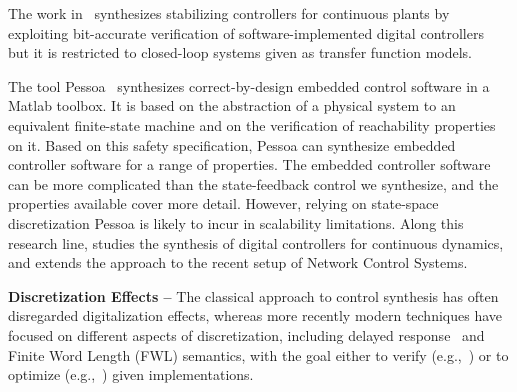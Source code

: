 \documentclass[sigconf]{llncs}
\begin{document}
The work in~\cite{hscc-paper} synthesizes stabilizing controllers for
continuous plants
by exploiting bit-accurate verification of software-implemented
digital controllers~\cite{Bessa16} but it is restricted to closed-loop
systems given as transfer function models.


The tool Pessoa~\cite{mazo2010pessoa} synthesizes correct-by-design embedded
control software in a Matlab toolbox.  It is based on the abstraction of a
physical system to an equivalent finite-state machine and on the
verification of reachability properties on it.  Based on this safety
specification, \mbox{Pessoa} can synthesize embedded controller software for
a range of properties.  The embedded controller software can be more
complicated than the state-feedback control we synthesize, and the
properties available cover more detail.  However, relying on state-space
discretization \mbox{Pessoa} is likely to incur in scalability limitations. 
Along this research line, \cite{Anta2010,liu16} studies the synthesis of
digital controllers for continuous dynamics, and \cite{zamani2014} extends
the approach to the recent setup of Network Control Systems.

\noindent\textbf{Discretization Effects --}
The classical approach to control synthesis has often disregarded
digitalization effects, whereas more recently modern techniques have focused
on different aspects of discretization, including delayed
response~\cite{Duggirala2015} and Finite Word Length (FWL) semantics, with
the goal either to verify (e.g.,~\cite{daes20161}) or to optimize
(e.g.,~\cite{oudjida2014design}) given implementations.
\end{document}
